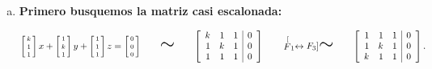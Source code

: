 \documentclass[11pt]{article}
\newcommand{\R}{\mathbb{R}}
\newcommand{\semejante}[1]{\stackrel[#1]{}{\text{\huge$\sim$}}}%
\begin{document}
\begin{enumerate}[\hspace{-5mm} 1) ]
\begin{enumerate}[a)]
\begin{itemize}
Por lo tanto: el sistema es incompatible para $k=0$. 


\bigskip 

\bigskip

\item Para que el sistema sea incompatible, solo nos queda el caso $k\neq 0$. Por lo tanto: el sistema es Compatible Indeterminado para $k \in \R -\{0\}$. 







\bigskip 



\end{itemize}





\bigskip 

\item \textbf{Primero  busquemos la  matriz casi escalonada:}
    
    
    
    $
    \left[\begin{smallmatrix}
    k \\[1mm]  1 \\[1mm]  1
    \end{smallmatrix}\right] x +
    \left[\begin{smallmatrix}
    1 \\[1mm]  k \\[1mm]  1
    \end{smallmatrix}\right] y +
    \left[\begin{smallmatrix}
    1 \\[1mm]  1 \\[1mm]  1
    \end{smallmatrix}\right] z =
    \left[\begin{smallmatrix}
    0 \\[1mm]  0 \\[1mm]  0
    \end{smallmatrix}\right]
    \qquad
\text{\huge$\sim$}
\qquad%
\left[
\begin{array}{rrr|r}
k & 1 & 1 & 0\\
1 & k & 1 & 0\\
1 & 1 & 1 & 0
\end{array}
\right]
\qquad 
\semejante{F_1 \leftrightarrow  F_3  }
\qquad
\left[
\begin{array}{rrc|c}
1 & 1 & 1 & 0\\
1 & k & 1 & 0\\
k & 1 & 1 & 0 
\end{array}
\right].
$


\end{enumerate}
\end{enumerate}
\end{document}
